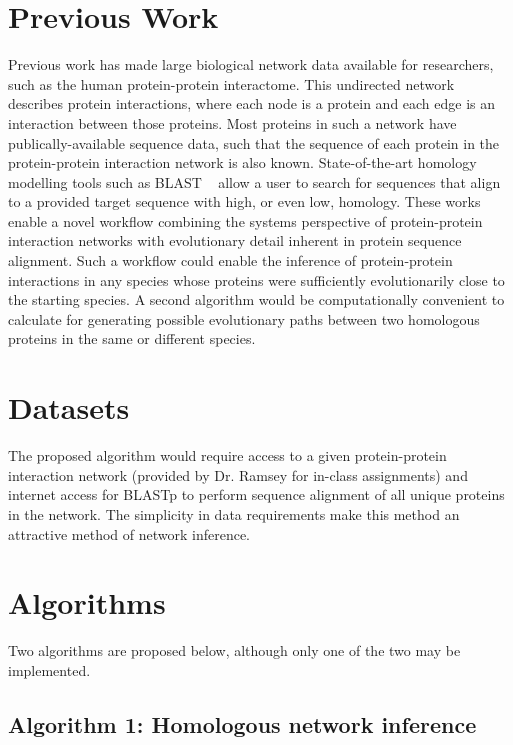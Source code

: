 \documentclass{acmsiggraph}               %
\begin{document}
\section{Previous Work}
\label{sec:previous_work}
Previous work has made large biological network data available for researchers, such as the human protein-protein interactome. This undirected network describes protein interactions, where each node is a protein and each edge is an interaction between those proteins. Most proteins in such a network have publically-available sequence data, such that the sequence of each protein in the protein-protein interaction network is also known. State-of-the-art homology modelling tools such as BLAST ~\cite{altschul_basic_1990} allow a user to search for sequences that align to a provided target sequence with high, or even low, homology. These works enable a novel workflow combining the systems perspective of protein-protein interaction networks with evolutionary detail inherent in protein sequence alignment. Such a workflow could enable the inference of protein-protein interactions in any species whose proteins were sufficiently evolutionarily close to the starting species. A second algorithm would be computationally convenient to calculate for generating possible evolutionary paths between two homologous proteins in the same or different species. 

\section{Datasets}
\label{sec:analysis}
The proposed algorithm would require access to a given protein-protein interaction network (provided by Dr. Ramsey for in-class assignments) and internet access for BLASTp to perform sequence alignment of all unique proteins in the network. The simplicity in data requirements make this method an attractive method of network inference.

\section{Algorithms}
\label{sec:algorithms}

Two algorithms are proposed below, although only one of the two may be implemented.

\subsection{Algorithm 1: Homologous network inference}
\end{document}
